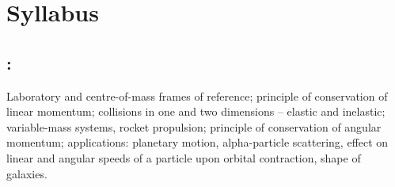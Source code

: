 
\thispagestyle{empty}

\section*{Syllabus}

    \subsection*{\topicSubTitle: \topicTitle}
        Laboratory and centre-of-mass frames of reference; principle of conservation of linear momentum; collisions in one and two dimensions -- elastic and inelastic; variable-mass systems, rocket propulsion; principle of conservation of angular momentum; applications: planetary motion, alpha-particle scattering, effect on linear and angular speeds of a particle upon orbital contraction, shape of galaxies.
        
\setcounter{page}{1}